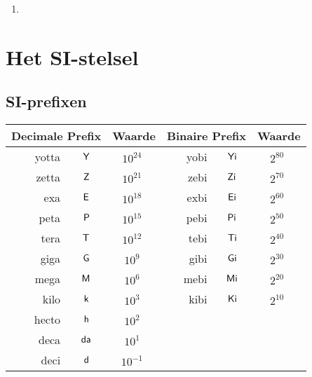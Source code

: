 \newpage\begin{enumerate}
         \item 
        \end{enumerate}

\section{Het SI-stelsel}
\label{app:SI}

\subsection{SI-prefixen}
\label{app:SIprefixes}

\begin{center}
\begin{tabular}{|r|c|c||r|c|c|}
\hline
\multicolumn{ 2}{|c|}{{\bf Decimale Prefix}} & {\bf Waarde} & \multicolumn{ 2}{|c|}{{\bf Binaire Prefix}} & {\bf Waarde} \\
\hline
\hline
     yotta & $\,\textsf{Y}\,$ & $10^{24^{\phantom n}}$ &       yobi & $\,\textsf{Yi}\,$ &  $2^{80^{\phantom n}}$ \\
\hline
     zetta & $\,\textsf{Z}\,$ & $10^{21^{\phantom n}}$ &       zebi & $\,\textsf{Zi}\,$ &  $2^{70^{\phantom n}}$ \\
\hline
       exa & $\,\textsf{E}\,$ & $10^{18^{\phantom n}}$ &       exbi & $\,\textsf{Ei}\,$ &  $2^{60^{\phantom n}}$ \\
\hline
      peta & $\,\textsf{P}\,$ & $10^{15^{\phantom n}}$ &       pebi & $\,\textsf{Pi}\,$ &  $2^{50^{\phantom n}}$ \\
\hline
      tera & $\,\textsf{T}\,$ & $10^{12^{\phantom n}}$ &       tebi & $\,\textsf{Ti}\,$ &  $2^{40^{\phantom n}}$ \\
\hline
      giga & $\,\textsf{G}\,$ &  $10^{9^{\phantom n}}$ &       gibi & $\,\textsf{Gi}\,$ &  $2^{30^{\phantom n}}$ \\
\hline
      mega & $\,\textsf{M}\,$ &  $10^{6^{\phantom n}}$ &       mebi & $\,\textsf{Mi}\,$ &  $2^{20^{\phantom n}}$ \\
\hline
      kilo & $\,\textsf{k}\,$ &  $10^{3^{\phantom n}}$ &       kibi & $\,\textsf{Ki}\,$ &  $2^{10^{\phantom n}}$ \\
\hline
     hecto & $\,\textsf{h}\,$ &  $10^{2^{\phantom n}}$ &            &            &            \\
\hline
      deca & $\,\textsf{da}\,$ &  $10^{1^{\phantom n}}$ &            &            &            \\
\hline
\hline
      deci & $\,\textsf{d}\,$ & $10^{-1^{\phantom n}}$ &            &            &            \\

\end{tabular}
\end{center}
